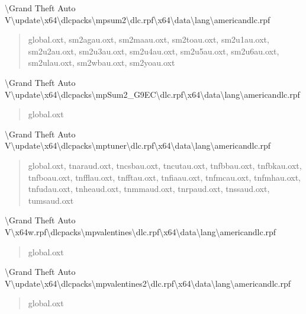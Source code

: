 \documentclass[]{scrartcl}
\begin{document}
\textbackslash{}Grand Theft Auto V\textbackslash{}update\textbackslash{}x64\textbackslash{}dlcpacks\textbackslash{}mpsum2\textbackslash{}dlc.rpf\textbackslash{}x64\textbackslash{}data\textbackslash{}lang\textbackslash{}americandlc.rpf

\begin{quote}
   \ttfamily
   global.oxt, sm2agau.oxt, sm2maau.oxt, sm2toau.oxt, sm2u1au.oxt, sm2u2au.oxt, sm2u3au.oxt, sm2u4au.oxt, sm2u5au.oxt, sm2u6au.oxt, sm2ulau.oxt, sm2wbau.oxt, sm2yoau.oxt
\end{quote}

\textbackslash{}Grand Theft Auto V\textbackslash{}update\textbackslash{}x64\textbackslash{}dlcpacks\textbackslash{}mpSum2\_G9EC\textbackslash{}dlc.rpf\textbackslash{}x64\textbackslash{}data\textbackslash{}lang\textbackslash{}americandlc.rpf

\begin{quote}
   \ttfamily
   global.oxt
\end{quote}

\textbackslash{}Grand Theft Auto V\textbackslash{}update\textbackslash{}x64\textbackslash{}dlcpacks\textbackslash{}mptuner\textbackslash{}dlc.rpf\textbackslash{}x64\textbackslash{}data\textbackslash{}lang\textbackslash{}americandlc.rpf

\begin{quote}
   \ttfamily
   global.oxt, tnaraud.oxt, tncsbau.oxt, tncutau.oxt, tnfbbau.oxt, tnfbkau.oxt, tnfboau.oxt, tnfflau.oxt, tnfftau.oxt, tnfiaau.oxt, tnfmcau.oxt, tnfmhau.oxt, tnfudau.oxt, tnheaud.oxt, tnmmaud.oxt, tnrpaud.oxt, tnssaud.oxt, tumsaud.oxt
\end{quote}

\textbackslash{}Grand Theft Auto V\textbackslash{}x64w.rpf\textbackslash{}dlcpacks\textbackslash{}mpvalentines\textbackslash{}dlc.rpf\textbackslash{}x64\textbackslash{}data\textbackslash{}lang\textbackslash{}americandlc.rpf

\begin{quote}
   \ttfamily
   global.oxt
\end{quote}

\textbackslash{}Grand Theft Auto V\textbackslash{}update\textbackslash{}x64\textbackslash{}dlcpacks\textbackslash{}mpvalentines2\textbackslash{}dlc.rpf\textbackslash{}x64\textbackslash{}data\textbackslash{}lang\textbackslash{}americandlc.rpf

\begin{quote}
   \ttfamily
   global.oxt
\end{quote}
\end{document}
